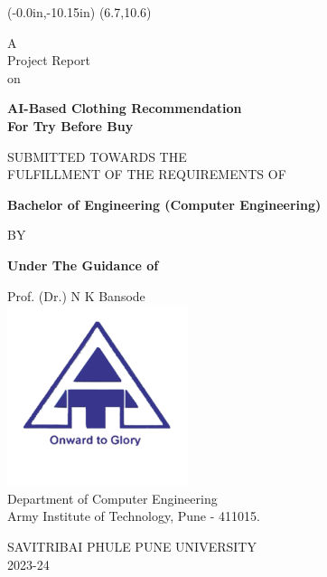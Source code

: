 \thisfancyput(-0.0in,-10.15in){
	\setlength{\unitlength}{1in}
	\framebox(6.7,10.6)
}
\setlength{\parindent}{0mm}
\begin{center}
	A \\ Project Report \\ on

	\vspace*{1\baselineskip}

	{
		\bfseries \Large
		AI-Based Clothing Recommendation \\ For Try Before Buy \\
		\vspace*{1.5\baselineskip}
	}

	SUBMITTED TOWARDS THE \\
	FULFILLMENT OF THE REQUIREMENTS OF \\
	
	\vspace*{1.5\baselineskip}

	{
		\bfseries \large
		Bachelor of Engineering (Computer Engineering) \\
		\vspace*{1\baselineskip}

		BY \\
		\vspace*{1\baselineskip}
	}

	\nametable

	\vspace*{0.5\baselineskip}

	{
		\bfseries \large
		Under The Guidance of \\  
		\vspace*{0.5\baselineskip}
	}

	Prof. (Dr.) N K Bansode\\[1cm]

	\includegraphics[scale=0.75]{components/images/logo.png} \\[0.5cm]
	
	Department of Computer Engineering \\
	Army Institute of Technology, Pune - 411015.\\
	\vspace*{0.5\baselineskip}

	SAVITRIBAI PHULE PUNE UNIVERSITY \\
	2023-24
\end{center}

\pagebreak